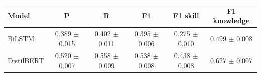 \begin{tabular}{l ccc cc}
\hline
Model & P & R & F1 & F1 skill & F1 knowledge \\
\hline
BiLSTM & 0.389 $\pm$ 0.015 & 0.402 $\pm$ 0.011 & 0.395 $\pm$ 0.006 & 0.275 $\pm$ 0.010 & 0.499 $\pm$ 0.008 \\
DistilBERT & 0.520 $\pm$ 0.007 & 0.558 $\pm$ 0.009 & 0.538 $\pm$ 0.008 & 0.438 $\pm$ 0.008 & 0.627 $\pm$ 0.007 \\
\hline
\end{tabular}
